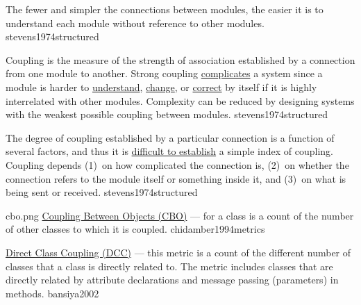\documentclass{article}
\begin{document}

  {The fewer and simpler the connections between modules, the easier it is to understand each module without reference to other modules.}
  {stevens1974structured}


  {Coupling is the measure of the strength of association established by a connection from one module to another. Strong coupling \ul{complicates} a system since a module is harder to \ul{understand}, \ul{change}, or \ul{correct} by itself if it is highly interrelated with other modules. Complexity can be reduced by designing systems with the weakest possible coupling between modules.}
  {stevens1974structured}


  {The degree of coupling established by a particular connection is a function of several factors, and thus it is \ul{difficult to establish} a simple index of coupling. Coupling depends (1)~on how complicated the connection is, (2)~on whether the connection refers to the module itself or something inside it, and (3)~on what is being sent or received.}
  {stevens1974structured}


\qte
  {cbo.png}
  {\ul{Coupling Between Objects (CBO)} --- for a class is a count of the number of other classes to which it is coupled.}
  {chidamber1994metrics}

  {\ul{Direct Class Coupling (DCC)} --- this metric is a count of the different number of classes that a class is directly related to. The metric includes classes that are directly related by attribute declarations and message passing (parameters) in methods.}
  {bansiya2002}
\end{document}
